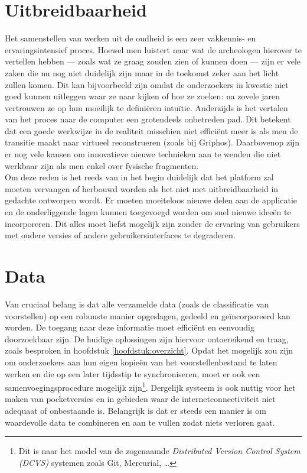 \section{Uitbreidbaarheid}
Het samenstellen van werken uit de oudheid is een zeer vakkennis- en ervaringsintensief proces. Hoewel men luistert naar wat de archeologen hierover te vertellen hebben --- zoals wat ze graag zouden zien of kunnen doen --- zijn er vele zaken die nu nog niet duidelijk zijn maar in de toekomst zeker aan het licht zullen komen. Dit kan bijvoorbeeld zijn omdat de onderzoekers in kwestie niet goed kunnen uitleggen waar ze naar kijken of hoe ze zoeken: na zovele jaren vertrouwen ze op hun moeilijk te defini\"eren intu\"itie. Anderzijds is het vertalen van het proces naar de computer een grotendeels onbetreden pad. Dit betekent dat een goede werkwijze in de realiteit misschien niet effici\"ent meer is als men de transitie maakt naar virtueel reconstrueren (zoals bij Griphos). Daarbovenop zijn er nog vele kansen om innovatieve nieuwe technieken aan te wenden die niet werkbaar zijn als men enkel over fysische fragmenten.\\

Om deze reden is het reeds van in het begin duidelijk dat het platform zal moeten vervangen of herbouwd worden als het niet met uitbreidbaarheid in gedachte ontworpen wordt. Er moeten moeiteloos nieuwe delen aan de applicatie en de onderliggende lagen kunnen toegevoegd worden om snel nieuwe idee\"en te incorporeren. Dit alles moet liefst mogelijk zijn zonder de ervaring van gebruikers met oudere versies of andere gebruikersinterfaces te degraderen.

\section{Data}
Van cruciaal belang is dat alle verzamelde data (zoals de classificatie van voorstellen) op een robuuste manier opgeslagen, gedeeld en ge\"incorporeerd kan worden. De toegang naar deze informatie moet effici\"ent en eenvoudig doorzoekbaar zijn. De huidige oplossingen zijn hiervoor ontoereikend en traag, zoals besproken in hoofdstuk \ref{hoofdstuk:overzicht}. Opdat het mogelijk zou zijn om onderzoekers aan hun eigen kopie\"en van het voorstellenbestand te laten werken en die op een later tijdsstip te synchroniseren, moet er ook een samenvoegingsprocedure mogelijk zijn\footnote{Dit is naar het model van de zogenaamde \emph{Distributed Version Control System (DCVS)} systemen zoals Git, Mercurial, \ldots}. Dergelijk systeem is ook nuttig voor het maken van pocketversies en in gebieden waar de internetconnectiviteit niet adequaat of onbestaande is. Belangrijk is dat er steeds een manier is om waardevolle data te combineren en aan te vullen zodat niets verloren gaat.\\

